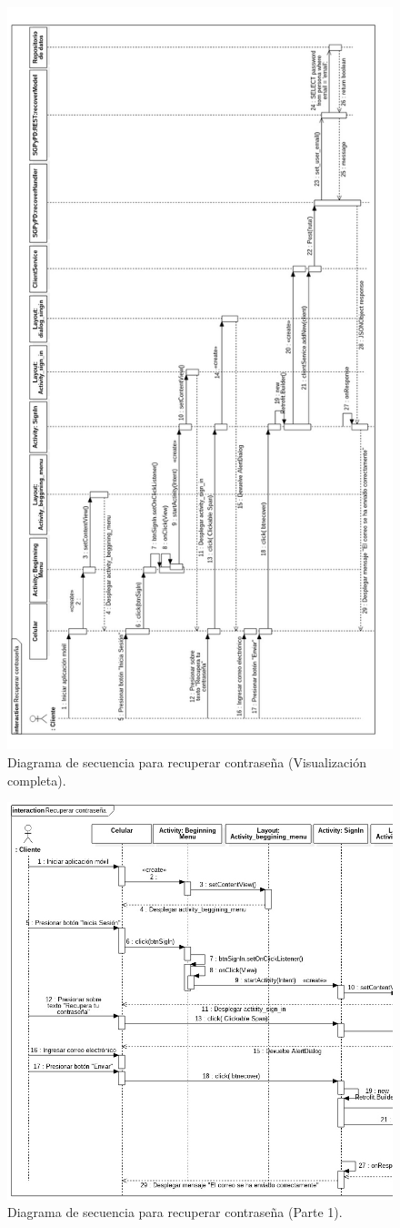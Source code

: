 \FloatBarrier
\begin{figure}[htbp!]
		\centering
			\includegraphics[width=0.57 \textwidth]{imagenes/Diagramas_UserApp/Nuevos_diagramas/Horizontal/recuperarContra}
		\caption{Diagrama de secuencia para recuperar contraseña (Visualización completa).}
		\label{image:DSRecuperaContra}
\end{figure}
\FloatBarrier

\FloatBarrier
\begin{figure}[htbp!]
		\centering
			\includegraphics[width=0.9 \textwidth]{imagenes/Diagramas_UserApp/Nuevos_diagramas/recuperarContra_1}
		\caption{Diagrama de secuencia para recuperar contraseña (Parte 1).}
		\label{image:DSRecuperaContra1}
\end{figure}
\FloatBarrier

